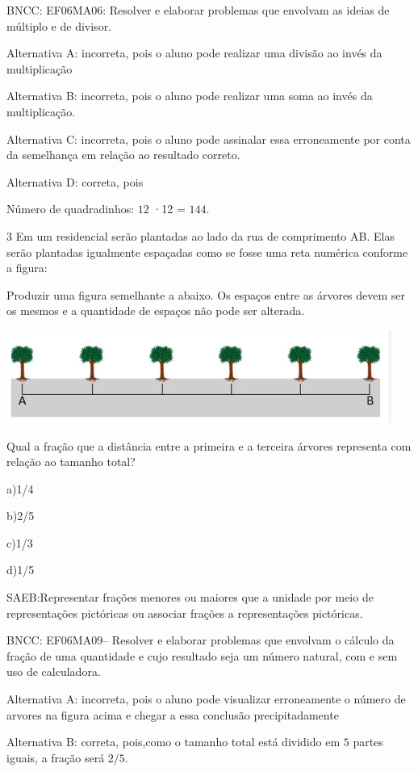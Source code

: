 BNCC: EF06MA06: Resolver e elaborar problemas que envolvam as ideias de
múltiplo e de divisor.

Alternativa A: incorreta, pois o aluno pode realizar uma divisão ao
invés da multiplicação

Alternativa B: incorreta, pois o aluno pode realizar uma soma ao invés
da multiplicação.

Alternativa C: incorreta, pois o aluno pode assinalar essa erroneamente
por conta da semelhança em relação ao resultado correto.

Alternativa D: correta, pois

Número de quadradinhos: $12$ ·12 = $144$.

\num{3}  Em um residencial serão plantadas ao lado da rua de comprimento AB.
Elas serão plantadas igualmente espaçadas como se fosse uma reta
numérica conforme a figura:

Produzir uma figura semelhante a abaixo. Os espaços entre as árvores
devem ser os mesmos e a quantidade de espaços não pode ser alterada.

\includegraphics[width=5in,height=1.19792in]{./imgSAEB_6_MAT/media/image109.png}

Qual a fração que a distância entre a primeira e a terceira árvores
representa com relação ao tamanho total?

a)1/4

b)2/5

c)1/3

d)1/5

SAEB:Representar frações menores ou maiores que a unidade por meio de
representações pictóricas ou associar frações a representações
pictóricas.

BNCC: EF06MA09-- Resolver e elaborar problemas que envolvam o cálculo da
fração de uma quantidade e cujo resultado seja um número natural, com e
sem uso de calculadora.

Alternativa A: incorreta, pois o aluno pode visualizar erroneamente o
número de arvores na figura acima e chegar a essa conclusão
precipitadamente

Alternativa B: correta, pois,como o tamanho total está dividido em $5$
partes iguais, a fração será $2/5$.


